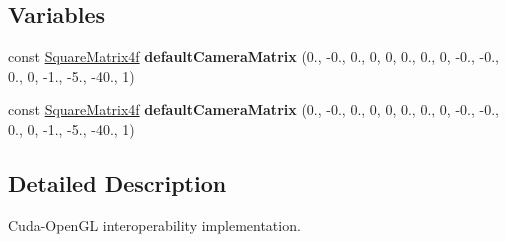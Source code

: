 \subsection*{Variables}
\begin{DoxyCompactItemize}
\item 
const \hyperlink{class_square_matrix4}{Square\+Matrix4f} {\bfseries default\+Camera\+Matrix} (0., -\/0., 0., 0, 0, 0., 0., 0, -\/0., -\/0., 0., 0, -\/1., -\/5., -\/40., 1)\hypertarget{group__api__graphics_gafdb8db8b7af78698e4ce48bf1ec7af05}{}\label{group__api__graphics_gafdb8db8b7af78698e4ce48bf1ec7af05}

\item 
const \hyperlink{class_square_matrix4}{Square\+Matrix4f} {\bfseries default\+Camera\+Matrix} (0., -\/0., 0., 0, 0, 0., 0., 0, -\/0., -\/0., 0., 0, -\/1., -\/5., -\/40., 1)\hypertarget{group__api__graphics_gafdb8db8b7af78698e4ce48bf1ec7af05}{}\label{group__api__graphics_gafdb8db8b7af78698e4ce48bf1ec7af05}

\end{DoxyCompactItemize}


\subsection{Detailed Description}
Cuda-\/\+Open\+GL interoperability implementation. 

